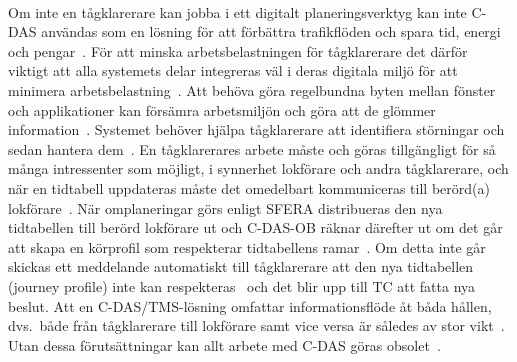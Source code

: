 \paragraph{}
\hspace{-14pt}
Om inte en tågklarerare kan jobba i ett digitalt planeringsverktyg kan inte C-DAS användas som en lösning för att förbättra trafikflöden och spara tid, energi och pengar~\cite{Tschirner2013}.
För att minska arbetsbelastningen för tågklarerare det därför viktigt att alla systemets delar integreras väl i deras digitala miljö för att minimera arbetsbelastning~\cite{Tschirner2013, Joborn2023}.
Att behöva göra regelbundna byten mellan fönster och applikationer kan försämra arbetsmiljön och göra att de glömmer information~\cite{Tschirner2013, Lindmark2022}.
Systemet behöver hjälpa tågklarerare att identifiera störningar och sedan hantera dem~\cite{Tschirner2013, Joborn2023}.
En tågklarerares arbete måste och göras tillgängligt för så många intressenter som möjligt, i synnerhet lokförare och andra tågklarerare, och när en tidtabell uppdateras måste det omedelbart kommuniceras till berörd(a) lokförare~\cite{Tschirner2013}.
När omplaneringar görs enligt SFERA distribueras den nya tidtabellen till berörd lokförare ut och C-DAS-OB räknar därefter ut om det går att skapa en körprofil som respekterar tidtabellens ramar~\cite{Sfera-usecase-poster-2022}.
Om detta inte går skickas ett meddelande automatiskt till tågklarerare att den nya tidtabellen (journey profile) inte kan respekteras~\cite{Sfera-usecase-poster-2022} och det blir upp till TC att fatta nya beslut.
Att en C-DAS/TMS-lösning omfattar informationsflöde åt båda hållen, dvs.~både från tågklarerare till lokförare samt vice versa är således av stor vikt~\cite{Tschirner2013}.
Utan dessa förutsättningar kan allt arbete med C-DAS göras obsolet~\cite{Tschirner2013}.
